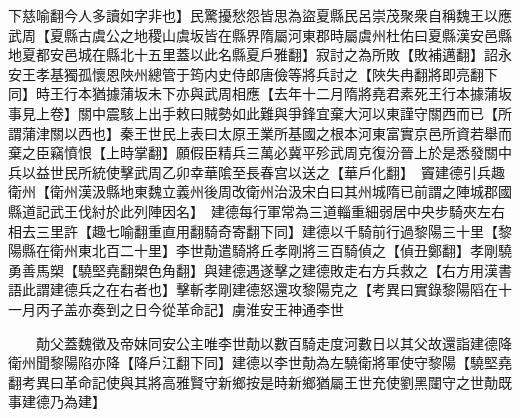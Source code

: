 下慈喻翻今人多讀如字非也】民驚擾愁怨皆思為盜夏縣民呂崇茂聚衆自稱魏王以應武周【夏縣古虞公之地稷山虞坂皆在縣界隋屬河東郡時屬虞州杜佑曰夏縣漢安邑縣地夏都安邑城在縣北十五里蓋以此名縣夏戶雅翻】寂討之為所敗【敗補邁翻】詔永安王孝基獨孤懷恩陜州總管于筠内史侍郎唐儉等將兵討之【陜失冉翻將即亮翻下同】時王行本猶據蒲坂未下亦與武周相應【去年十二月隋將堯君素死王行本據蒲坂事見上卷】關中震駭上出手敕曰賊勢如此難與爭鋒宜棄大河以東謹守關西而已【所謂蒲津關以西也】秦王世民上表曰太原王業所基國之根本河東富實京邑所資若舉而棄之臣竊憤恨【上時掌翻】願假臣精兵三萬必冀平殄武周克復汾晉上於是悉發關中兵以益世民所統使擊武周乙卯幸華隂至長春宫以送之【華戶化翻】　竇建德引兵趣衛州【衛州漢汲縣地東魏立義州後周改衛州治汲宋白曰其州城隋已前謂之陣城郡國縣道記武王伐紂於此列陣因名】　建德每行軍常為三道輜重細弱居中央步騎夾左右相去三里許【趣七喻翻重直用翻騎奇寄翻下同】建德以千騎前行過黎陽三十里【黎陽縣在衛州東北百二十里】李世勣遣騎將丘孝剛將三百騎偵之【偵丑鄭翻】孝剛驍勇善馬槊【驍堅堯翻槊色角翻】與建德遇遂擊之建德敗走右方兵救之【右方用漢書語此謂建德兵之在右者也】擊斬孝剛建德怒還攻黎陽克之【考異曰實錄黎陽䧟在十一月丙子盖亦奏到之日今從革命記】虜淮安王神通李世

　　勣父蓋魏徵及帝妺同安公主唯李世勣以數百騎走度河數日以其父故還詣建德降衛州聞黎陽陷亦降【降戶江翻下同】建德以李世勣為左驍衛將軍使守黎陽【驍堅堯翻考異曰革命記使與其將高雅賢守新鄉按是時新鄉猶屬王世充使劉黑闥守之世勣既事建德乃為建】

